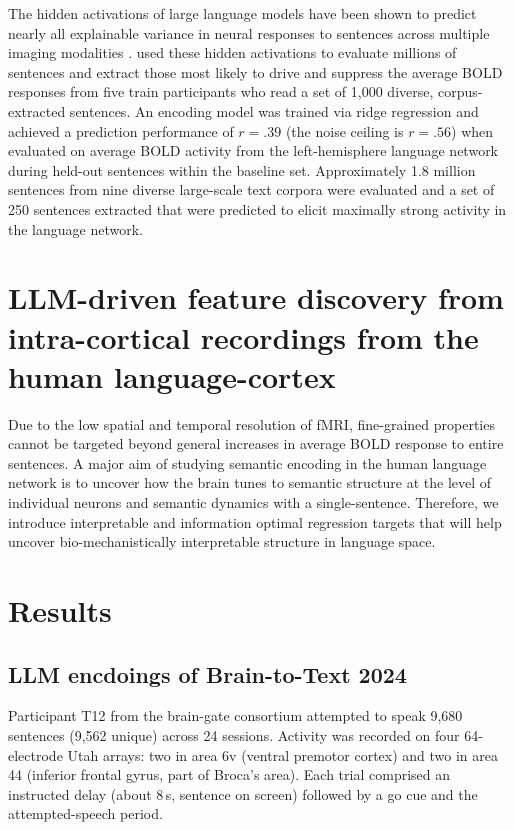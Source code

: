\documentclass[11pt]{article}
\begin{document}
The hidden activations of large language models have been shown to predict nearly all explainable variance in neural responses to sentences across multiple imaging modalities \cite{schrimpf2021neural}. \citet{tuckute2023driving} used these hidden activations to evaluate millions of sentences and extract those most likely to drive and suppress the average BOLD responses from five train participants who read a set of 1,000 diverse, corpus-extracted sentences. An encoding model was trained via ridge regression and achieved a prediction performance of $r=.39$ (the noise ceiling is $r=.56$) when evaluated on average BOLD activity from the left-hemisphere language network during held-out sentences within the baseline set. Approximately 1.8 million sentences from nine diverse large-scale text corpora were evaluated and a set of 250 sentences extracted  that were predicted to elicit maximally strong activity in the language network.

\section{LLM-driven feature discovery from intra-cortical recordings from the human language-cortex}

Due to the low spatial and temporal resolution of fMRI, fine-grained properties cannot be targeted beyond general increases in average BOLD response to entire sentences. A major aim of studying semantic encoding in the human language network is to uncover how the brain tunes to semantic structure at the level of individual neurons and semantic dynamics with a single-sentence. Therefore, we introduce interpretable and information optimal regression targets that will help uncover bio-mechanistically interpretable structure in language space.

\section{Results}
\subsection{LLM encdoings of Brain-to-Text 2024}

Participant T12 from the brain-gate consortium\cite{willett2023speech} attempted to speak 9,680 sentences (9,562 unique) across 24 sessions. Activity was recorded on four 64-electrode Utah arrays: two in area 6v (ventral premotor cortex) and two in area 44 (inferior frontal gyrus, part of Broca's area). Each trial comprised an instructed delay (about 8\,s, sentence on screen) followed by a go cue and the attempted-speech period.
\end{document}
